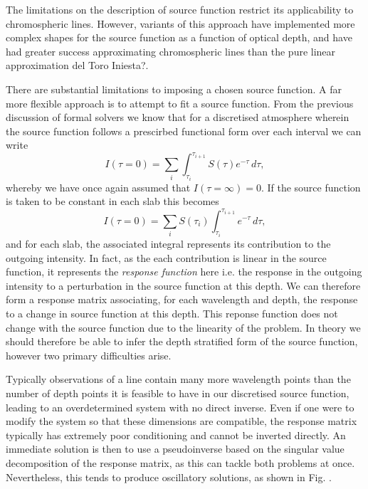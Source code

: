 The limitations on the description of source function restrict its applicability to chromospheric lines.
However, variants of this approach have implemented more complex shapes for the source function as a function of optical depth, and have had greater success approximating chromospheric lines than the pure linear approximation \NeedRef{} del Toro Iniesta?.

There are substantial limitations to imposing a chosen source function.
A far more flexible approach is to attempt to fit a source function.
From the previous discussion of formal solvers we know that for a discretised atmosphere wherein the source function follows a prescirbed functional form over each interval we can write
\begin{equation}
    I(\tau=0) = \sum_i \int_{\tau_i}^{\tau_{i+1}} S(\tau)e^{-\tau}\, d\tau,
\end{equation}
whereby we have once again assumed that $I(\tau=\infty)=0$.
If the source function is taken to be constant in each slab this becomes
\begin{equation}
    I(\tau=0) = \sum_i S(\tau_i) \int_{\tau_i}^{\tau_{i+1}} e^{-\tau}\, d\tau,
\end{equation}
and for each slab, the associated integral represents its contribution to the outgoing intensity. In fact, as the each contribution is linear in the source function, it represents the \emph{response function} here i.e. the response in the outgoing intensity to a perturbation in the source function at this depth.
We can therefore form a response matrix associating, for each wavelength and depth, the response to a change in source function at this depth.
This reponse function does not change with the source function due to the linearity of the problem.
In theory we should therefore be able to infer the depth stratified form of the source function, however two primary difficulties arise.

Typically observations of a line contain many more wavelength points than the number of depth points it is feasible to have in our discretised source function, leading to an overdetermined system with no direct inverse.
Even if one were to modify the system so that these dimensions are compatible, the response matrix typically has extremely poor conditioning and cannot be inverted directly.
An immediate solution is then to use a pseudoinverse based on the singular value decomposition of the response matrix, as this can tackle both problems at once.
Nevertheless, this tends to produce oscillatory solutions, as shown in Fig. \NeedRef{}.

